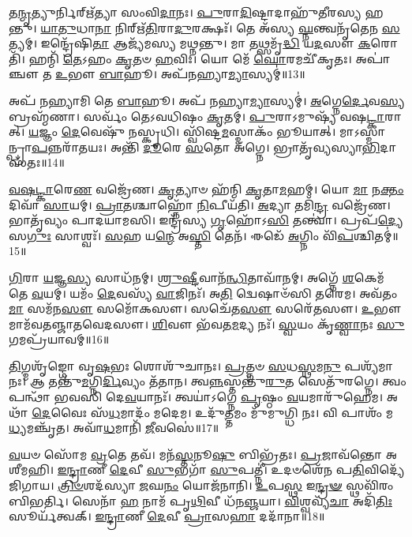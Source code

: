 𑌤\-\ul{𑌨𑍍𑌮𑍃}\-𑌤𑍍𑌯𑍁𑌰𑍍𑌨𑌿𑌰𑍍\mbox{}𑌋᳴𑌤𑍍𑌯𑌾 𑌸𑌂𑌵𑌿\-\ul{𑌦𑌾}\-𑌨𑌃।
\-\ul{𑌪𑍁}\-𑌰𑌾\-\ul{𑌦𑌿}\-𑌷𑍍𑌟𑌾𑌦𑌾𑌹𑍁᳴𑌤𑍀𑌰𑌸𑍍𑌯 𑌹𑌨𑍍𑌤𑍁।
\-\ul{𑌯𑌾}\-\-\ul{𑌤𑍁}\-𑌧𑌾\-\ul{𑌨𑌾} 𑌨𑌿𑌰𑍍\mbox{}𑌋᳴\-\ul{𑌤𑌿}\-𑌰𑌾\-\ul{𑌦𑍁}\-𑌰𑌕𑍍𑌷𑌃᳴।
𑌤𑍇 𑌅᳴𑌸𑍍𑌯 \ul{𑌘𑍍𑌨}\-𑌨𑍍𑌤𑍍𑌵𑌨𑍃᳴𑌤𑍇𑌨 \ul{𑌸}\-𑌤𑍍𑌯𑌮𑍍।
𑌇𑌨𑍍𑌦𑍍𑌰𑍇᳴𑌷𑌿\-\ul{𑌤𑌾} 𑌆𑌜𑍍𑌯᳴𑌮𑌸𑍍𑌯 𑌮𑌥𑍍𑌨𑌨𑍍𑌤𑍁।
𑌮𑌾 𑌤𑌥𑍍𑌸𑌮𑍃᳴\-\ul{𑌦𑍍𑌧𑌿} 𑌯\-\ul{𑌦}\-𑌸𑍗 \ul{𑌕}\-𑌰𑍋𑌤𑌿᳴।
𑌹𑌨𑍍𑌮𑌿᳴ \ul{𑌤𑍇}\-𑌽𑌹𑌂 \ul{𑌕𑍃}\-𑌤𑍞 \ul{𑌹}\-𑌵𑌿𑌃।
𑌯𑍋 𑌮𑍇᳴ \ul{𑌘𑍋}\-𑌰𑌮𑌚𑍀᳴𑌕𑍃𑌤𑌃।
𑌅𑌪𑌾॑𑌞𑍍𑌚𑍗 𑌤 \ul{𑌉}\-𑌭𑍗 \ul{𑌬𑌾}\-𑌹𑍂।
𑌅𑌪᳴𑌨𑌹𑍍𑌯𑌾\-\ul{𑌮𑍍𑌯𑌾}\-𑌸𑍍𑌯𑌮𑍍॑॥13॥

𑌅𑌪᳴ 𑌨𑌹𑍍𑌯𑌾𑌮𑌿 𑌤𑍇 \ul{𑌬𑌾}\-𑌹𑍂।
𑌅𑌪᳴ 𑌨𑌹𑍍𑌯𑌾\-\ul{𑌮𑍍𑌯𑌾}\-𑌸𑍍𑌯𑌮𑍍॑।
\-\ul{𑌅}\-𑌗𑍍𑌨𑍇\-\ul{𑌰𑍍𑌦𑍇}\-𑌵\-\ul{𑌸𑍍𑌯} 𑌬𑍍𑌰𑌹𑍍𑌮᳴𑌣𑌾।
𑌸𑌰𑍍𑌵𑌂᳴ 𑌤𑍇𑌽𑌵𑌧𑌿𑌷𑌂 \ul{𑌕𑍃}\-𑌤𑌮𑍍।
\-\ul{𑌪𑍁}\-𑌰𑌾\-𑌽𑌮𑍁𑌷𑍍𑌯᳴ 𑌵𑌷\-\ul{𑌟𑍍𑌕𑌾}\-𑌰𑌾𑌤𑍍।
\-\ul{𑌯}\-𑌜𑍍𑌞𑌂 \ul{𑌦𑍇}\-𑌵𑍇𑌷𑍁᳴ 𑌨𑌸𑍍𑌕𑍃𑌧𑌿।
𑌸𑍍𑌵𑌿᳴𑌷𑍍𑌟\-\ul{𑌮}\-𑌸𑍍𑌮𑌾𑌕𑌂᳴ 𑌭𑍂𑌯𑌾𑌤𑍍।
𑌮𑌾𑌽𑌸𑍍𑌮𑌾𑌨𑍍𑌪𑍍𑌰𑌾\-\ul{𑌪}\-𑌨𑍍𑌨\-𑌰𑌾᳴𑌤𑌯𑌃।
𑌅𑌨𑍍𑌤𑌿᳴ \ul{𑌦𑍂}\-𑌰𑍇 \ul{𑌸}\-𑌤𑍋 𑌅᳴𑌗𑍍𑌨𑍇।
𑌭𑍍𑌰𑌾𑌤𑍃᳴𑌵𑍍𑌯𑌸𑍍𑌯𑌾\-\ul{𑌭𑌿}\-𑌦𑌾𑌸᳴𑌤𑌃॥14॥

\-\ul{𑌵}\-\-\ul{𑌷}\-\-\ul{𑌟𑍍𑌕𑌾}\-𑌰𑍇\-\ul{𑌣} 𑌵𑌜𑍍𑌰𑍇᳴𑌣।
\-\ul{𑌕𑍃}\-𑌤𑍍𑌯𑌾𑍞 𑌹᳴𑌨𑍍𑌮𑌿 \ul{𑌕𑍃}\-𑌤𑌾\-\ul{𑌮}\-𑌹𑌮𑍍।
𑌯𑍋 \ul{𑌮𑌾} 𑌨\-\ul{𑌕𑍍𑌤𑌂} 𑌦𑌿𑌵𑌾᳴ \ul{𑌸𑌾}\-𑌯𑌮𑍍।
\-\ul{𑌪𑍍𑌰𑌾}\-𑌤𑌶𑍍𑌚𑌾𑌹𑍍𑌨𑍋᳴ \ul{𑌨𑌿}\-𑌪𑍀𑌯᳴𑌤𑌿।
\-\ul{𑌅}\-𑌦𑍍𑌯𑌾 𑌤𑌮𑌿᳴\-\ul{𑌨𑍍𑌦𑍍𑌰} 𑌵𑌜𑍍𑌰𑍇᳴𑌣।
𑌭𑌾𑌤𑍃᳴𑌵𑍍𑌯𑌂 𑌪𑌾𑌦𑌯𑌾𑌮𑌸𑌿।
𑌇𑌨𑍍𑌦𑍍𑌰᳴𑌸𑍍𑌯 \ul{𑌗𑍃}\-𑌹𑍋᳴𑌽\-\ul{𑌸𑌿} 𑌤𑌨𑍍𑌤𑍍𑌵𑌾॑।
𑌪𑍍𑌰𑌪᳴\-\ul{𑌦𑍍𑌯𑍇} 𑌸\-\ul{𑌗𑍁𑌃} 𑌸𑌾𑌶𑍍𑌵𑌃᳴।
\-\ul{𑌸}\-𑌹 𑌯\-\ul{𑌨𑍍𑌮𑍇} 𑌅\-\ul{𑌸𑍍𑌤𑌿} 𑌤𑍇𑌨᳴।
𑌈𑌡𑍇᳴ \ul{𑌅}\-𑌗𑍍𑌨𑌿𑌂 𑌵𑌿᳴\-\ul{𑌪}\-𑌶𑍍𑌚𑌿𑌤𑌮𑍍॑॥15॥

\-\ul{𑌗𑌿}\-𑌰𑌾 \ul{𑌯}\-𑌜𑍍𑌞\-\ul{𑌸𑍍𑌯} 𑌸𑌾𑌧᳴𑌨𑌮𑍍।
\-\ul{𑌶𑍍𑌰𑍁}\-\-\ul{𑌷𑍍𑌟𑍀}\-𑌵𑌾𑌨᳴\-\ul{𑌨𑍍𑌧𑌿}\-𑌤𑌾𑌵𑌾᳴𑌨𑌮𑍍।
𑌅𑌗𑍍𑌨𑍇᳴ \ul{𑌶}\-𑌕𑍇𑌮᳴ 𑌤𑍇 \ul{𑌵}\-𑌯𑌮𑍍।
𑌯𑌮𑌂᳴ \ul{𑌦𑍇}\-𑌵𑌸𑍍𑌯᳴ \ul{𑌵𑌾}\-𑌜𑌿𑌨𑌃᳴।
𑌅\-\ul{𑌤𑌿} 𑌦𑍍𑌵𑍇𑌷𑌾𑍞᳴𑌸𑌿 𑌤𑌰𑍇𑌮।
𑌅𑌵᳴𑌤𑌂 \ul{𑌮𑌾} 𑌸𑌮᳴𑌨\-\ul{𑌸𑍗} 𑌸𑌮𑍋᳴𑌕𑌸𑍗।
𑌸𑌚𑍇᳴𑌤\-\ul{𑌸𑍗} 𑌸𑌰𑍇᳴𑌤𑌸𑍗।
\-\ul{𑌉}\-𑌭𑍗 𑌮𑌾𑌮᳴𑌵𑌤𑌞𑍍𑌜𑌾𑌤𑌵𑍇𑌦𑌸𑍗।
\-\ul{𑌶𑌿}\-𑌵𑍗 𑌭᳴𑌵𑌤\-\ul{𑌮}\-𑌦𑍍𑌯 𑌨𑌃᳴।
\-\ul{𑌸𑍍𑌵}\-𑌯𑌂 𑌕𑍃᳴\-\ul{𑌣𑍍𑌵𑌾}\-𑌨𑌃 \ul{𑌸𑍁}\-𑌗𑌮𑌪𑍍𑌰᳴𑌯𑌾𑌵𑌮𑍍॥16॥

\-\ul{𑌤𑌿}\-𑌗𑍍𑌮𑌶𑍃᳴𑌙𑍍𑌗𑍋 𑌵𑍃\-\ul{𑌷}\-𑌭𑌃 𑌶𑍋𑌶𑍁᳴𑌚𑌾𑌨𑌃।
\-\ul{𑌪𑍍𑌰}\-𑌤𑍍𑌨𑍞 \ul{𑌸}\-𑌧\-\ul{𑌸𑍍𑌥}\-𑌮\-\ul{𑌨𑍁} 𑌪𑌶𑍍𑌯᳴𑌮𑌾𑌨𑌃।
𑌆 𑌤𑌨𑍍𑌤𑍁᳴\-\ul{𑌮}\-𑌗𑍍𑌨𑌿\-\ul{𑌰𑍍𑌦𑌿}\-𑌵𑍍𑌯𑌂 𑌤᳴𑌤𑌾𑌨।
𑌤𑍍𑌵\-\ul{𑌨𑍍𑌨}\-𑌸𑍍𑌤𑌨𑍍𑌤𑍁᳴\-\ul{𑌰𑍁}\-𑌤 𑌸𑍇𑌤𑍁᳴𑌰𑌗𑍍𑌨𑍇।
𑌤𑍍𑌵𑌂 𑌪𑌨𑍍𑌥𑌾᳴ 𑌭𑌵𑌸𑌿 𑌦𑍇\-\ul{𑌵}\-𑌯𑌾𑌨𑌃᳴।
𑌤𑍍𑌵𑌯𑌾॑\-𑌽𑌗𑍍𑌨𑍇 \ul{𑌪𑍃}\-𑌷𑍍𑌠𑌂 \ul{𑌵}\-𑌯𑌮𑌾𑌰𑍁᳴𑌹𑍇𑌮।
𑌅𑌥𑌾᳴ \ul{𑌦𑍇}\-𑌵𑍈𑌃 𑌸᳴\-\ul{𑌧}\-𑌮𑌾𑌦𑌂᳴ 𑌮𑌦𑍇𑌮।
𑌉𑌦𑍁᳴\-\ul{𑌤𑍍𑌤}\-𑌮𑌂 𑌮𑍁᳴𑌮𑍁𑌗𑍍𑌧𑌿 𑌨𑌃।
𑌵𑌿 𑌪𑌾𑌶𑌂᳴ 𑌮\-\ul{𑌧𑍍𑌯}\-𑌮𑌞𑍍𑌚𑍃᳴𑌤।
𑌅𑌵𑌾᳴\-\ul{𑌧}\-𑌮𑌾𑌨𑌿᳴ \ul{𑌜𑍀}\-𑌵𑌸𑍇॑॥17॥

\-\ul{𑌵}\-𑌯𑍞 𑌸𑍋᳴𑌮 \ul{𑌵𑍍𑌰}\-𑌤𑍇 𑌤𑌵᳴।
𑌮𑌨᳴\-\ul{𑌸𑍍𑌤}\-𑌨𑍂\-\ul{𑌷𑍁} 𑌬𑌿𑌭𑍍𑌰᳴𑌤𑌃।
\-\ul{𑌪𑍍𑌰}\-𑌜𑌾𑌵᳴𑌨𑍍𑌤𑍋 𑌅𑌶𑍀𑌮𑌹𑌿।
\-\ul{𑌇}\-\-\ul{𑌨𑍍𑌦𑍍𑌰𑌾}\-𑌣𑍀 \ul{𑌦𑍇}\-𑌵𑍀 \ul{𑌸𑍁}\-𑌭𑌗𑌾᳴ \ul{𑌸𑍁}\-𑌪𑌤𑍍𑌨𑍀॑।
𑌉𑌦𑍞𑌶𑍇᳴𑌨 𑌪\-\ul{𑌤𑌿}\-𑌵𑌿𑌦𑍍𑌯𑍇᳴ 𑌜𑌿𑌗𑌾𑌯।
\-\ul{𑌤𑍍𑌰𑌿}\-\-\ul{𑍞}\-𑌶𑌦᳴𑌸𑍍𑌯𑌾 \ul{𑌜}\-𑌘\-\ul{𑌨𑌂} 𑌯𑍋𑌜᳴𑌨𑌾𑌨𑌿।
\-\ul{𑌉}\-𑌪\-\ul{𑌸𑍍𑌥} 𑌇\-\ul{𑌨𑍍𑌦𑍍𑌰}\-\-\ul{𑍟} 𑌸𑍍𑌥𑌵𑌿᳴𑌰𑌂 𑌬𑌿𑌭𑌰𑍍𑌤𑌿।
𑌸𑍇𑌨𑌾᳴ \ul{𑌹} 𑌨𑌾𑌮᳴ 𑌪𑍃\-\ul{𑌥𑌿}\-𑌵𑍀 𑌧᳴𑌨\-\ul{𑌞𑍍𑌜}\-𑌯𑌾।
\-\ul{𑌵𑌿}\-𑌶𑍍𑌵𑌵𑍍𑌯᳴\-\ul{𑌚𑌾} 𑌅𑌦𑌿᳴\-\ul{𑌤𑌿𑌃} 𑌸𑍂𑌰𑍍𑌯᳴𑌤𑍍𑌵𑌕𑍍।
\-\ul{𑌇}\-\-\ul{𑌨𑍍𑌦𑍍𑌰𑌾}\-𑌣𑍀 \ul{𑌦𑍇}\-𑌵𑍀 \ul{𑌪𑍍𑌰𑌾}\-𑌸\-\ul{𑌹𑌾} 𑌦𑌦𑌾᳴𑌨𑌾॥18॥

